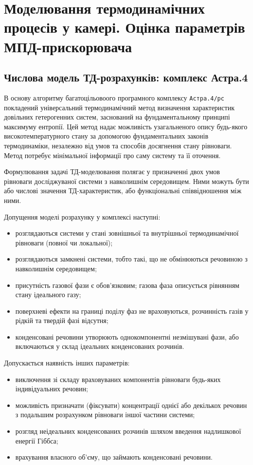 \chapter{Моделювання термодинамічних процесів у камері. Оцінка параметрів МПД-прискорювача}\label{sec:model_conditions}

\section{Числова модель ТД-розрахунків: комплекс Астра.4}


В основу алгоритму багатоцільовоого програмного комплексу \texttt{Астра.4/рс} покладений універсальний термодинамічний метод визначення характеристик довільних гетерогенних систем, заснований на фундаментальному принципі максимуму ентропії. Цей метод надає можливість узагальненого опису будь-якого високотемпературного стану за допомогою фундаментальних законів термодинаміки, незалежно від умов та способів досягнення стану рівноваги. Метод потребує мінімальної інформації про саму систему та її оточення.

Формулювання задачі ТД-моделювання полягає у призначенні двох умов рівноваги досліджуваної системи з навколишнім середовищем. Ними можуть бути або числові значення ТД-характеристик, або функціональні співвідношення між ними.

Допущення моделі розрахунку у комплексі наступні:
\begin{itemize}
	\item розглядаються системи у стані зовнішньої та внутрішньої термодинамічної рівноваги (повної чи локальної);
	\item розглядаються замкнені системи, тобто такі, що не обмінюються речовиною з навколишнім середовищем;
	\item присутність газової фази є обов'язковим; газова фаза описується рівнянням стану ідеального газу;
	\item поверхневі ефекти на границі поділу фаз не враховуються, розчинність газів у рідкій та твердій фазі відсутня;
	\item конденсовані речовини утворюють однокомпонентні незмішувані фази, або включаються у склад ідеальних конденсованих розчинів.
\end{itemize}

Допускається наявність інших параметрів:
\begin{itemize}
	\item виключення зі складу враховуваних компонентів рівноваги будь-яких індивідуальних речовин;
	\item можливість призначати (фіксувати) концентрації однієї або декількох речовин з подальшим розрахунком рівноваги іншої частини системи;
	\item розгляд неідеальних конденсованих розчинів шляхом введення надлишкової енергії Гіббса;
	\item врахування власного об'єму, що займають конденсовані речовини.	
\end{itemize}

